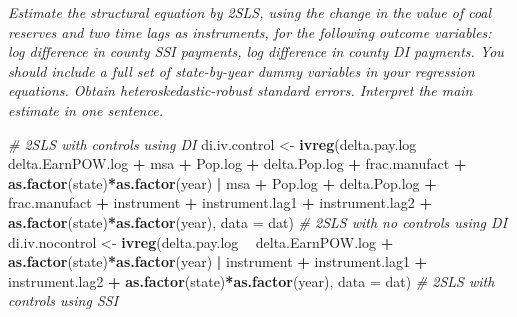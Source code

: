 \documentclass[
]{article}
\newenvironment{Shaded}{\begin{snugshade}}{\end{snugshade}}
\newcommand{\CommentTok}[1]{\textcolor[rgb]{0.56,0.35,0.01}{\textit{#1}}}
\newcommand{\DataTypeTok}[1]{\textcolor[rgb]{0.13,0.29,0.53}{#1}}
\newcommand{\KeywordTok}[1]{\textcolor[rgb]{0.13,0.29,0.53}{\textbf{#1}}}
\newcommand{\NormalTok}[1]{#1}
\newcommand{\OperatorTok}[1]{\textcolor[rgb]{0.81,0.36,0.00}{\textbf{#1}}}
\newcommand{\StringTok}[1]{\textcolor[rgb]{0.31,0.60,0.02}{#1}}
\begin{document}
\textit{Estimate the structural equation by 2SLS, using the change in the value of coal reserves and two time lags as instruments, for the following outcome variables: log difference in county SSI payments, log difference in county DI payments. You should include a full set of state-by-year dummy variables in your regression equations. Obtain heteroskedastic-robust standard errors. Interpret the main estimate in one sentence.}

\begin{Shaded}
\begin{Highlighting}[]
\CommentTok{# 2SLS with controls using DI}
\NormalTok{di.iv.control <-}\StringTok{ }\KeywordTok{ivreg}\NormalTok{(delta.pay.log }\OperatorTok{~}\StringTok{ }\NormalTok{delta.EarnPOW.log }\OperatorTok{+}\StringTok{ }\NormalTok{msa }\OperatorTok{+}\StringTok{ }\NormalTok{Pop.log }\OperatorTok{+}
\StringTok{                         }\NormalTok{delta.Pop.log }\OperatorTok{+}\StringTok{ }\NormalTok{frac.manufact }\OperatorTok{+}\StringTok{ }
\StringTok{                         }\KeywordTok{as.factor}\NormalTok{(state)}\OperatorTok{*}\KeywordTok{as.factor}\NormalTok{(year) }\OperatorTok{|}\StringTok{ }\NormalTok{msa }\OperatorTok{+}\StringTok{ }\NormalTok{Pop.log }\OperatorTok{+}\StringTok{ }
\StringTok{                         }\NormalTok{delta.Pop.log }\OperatorTok{+}\StringTok{ }\NormalTok{frac.manufact }\OperatorTok{+}\StringTok{ }\NormalTok{instrument }\OperatorTok{+}\StringTok{ }
\StringTok{                         }\NormalTok{instrument.lag1 }\OperatorTok{+}\StringTok{ }\NormalTok{instrument.lag2 }\OperatorTok{+}\StringTok{ }
\StringTok{                         }\KeywordTok{as.factor}\NormalTok{(state)}\OperatorTok{*}\KeywordTok{as.factor}\NormalTok{(year), }\DataTypeTok{data =}\NormalTok{ dat)}
\CommentTok{# 2SLS with no controls using DI}
\NormalTok{di.iv.nocontrol <-}\StringTok{ }\KeywordTok{ivreg}\NormalTok{(delta.pay.log }\OperatorTok{~}\StringTok{ }\NormalTok{delta.EarnPOW.log }\OperatorTok{+}\StringTok{ }
\StringTok{                           }\KeywordTok{as.factor}\NormalTok{(state)}\OperatorTok{*}\KeywordTok{as.factor}\NormalTok{(year) }\OperatorTok{|}\StringTok{ }\NormalTok{instrument }\OperatorTok{+}\StringTok{ }
\StringTok{                           }\NormalTok{instrument.lag1 }\OperatorTok{+}\StringTok{ }\NormalTok{instrument.lag2 }\OperatorTok{+}\StringTok{ }
\StringTok{                           }\KeywordTok{as.factor}\NormalTok{(state)}\OperatorTok{*}\KeywordTok{as.factor}\NormalTok{(year), }\DataTypeTok{data =}\NormalTok{ dat)}
\CommentTok{# 2SLS with  controls using SSI}

\end{Highlighting}
\end{Shaded}
\end{document}
